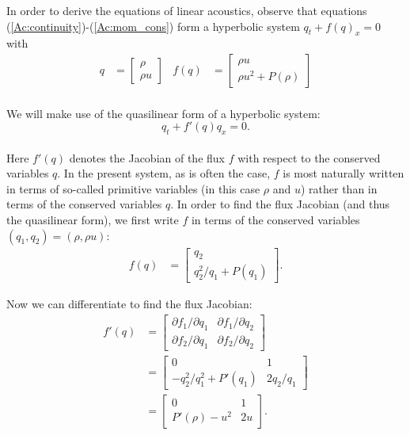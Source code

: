\documentclass[11pt]{article}
\begin{document}
    In order to derive the equations of linear acoustics, observe that
equations (\ref{Ac:continuity})-(\ref{Ac:mom_cons}) form a hyperbolic
system \(q_t+f(q)_x=0\) with\\
\begin{align*}
q & = \begin{bmatrix} \rho \\ \rho u \end{bmatrix} & 
f(q) & = \begin{bmatrix} \rho u \\ \rho u^2 + P(\rho) \end{bmatrix}
\end{align*}\\
We will make use of the quasilinear form of a hyperbolic system:
\[q_t + f'(q) q_x = 0.\]\\
Here \(f'(q)\) denotes the Jacobian of the flux \(f\) with respect to
the conserved variables \(q\). In the present system, as is often the
case, \(f\) is most naturally written in terms of so-called primitive
variables (in this case \(\rho\) and \(u\)) rather than in terms of the
conserved variables \(q\). In order to find the flux Jacobian (and thus
the quasilinear form), we first write \(f\) in terms of the conserved
variables \((q_1,q_2) = (\rho, \rho u)\):\\
\begin{align}
f(q) & = \begin{bmatrix} q_2 \\ q_2^2/q_1 + P(q_1) \end{bmatrix}.
\end{align}

    Now we can differentiate to find the flux Jacobian:\\
\begin{align*}
f'(q) & = \begin{bmatrix} \partial f_1/\partial q_1 & \partial f_1/\partial q_2 \\
                          \partial f_2/\partial q_1 & \partial f_2/\partial q_2 \end{bmatrix} \\
      & = \begin{bmatrix} 0 & 1 \\ -q_2^2/q_1^2 + P'(q_1) & 2q_2/q_1 \end{bmatrix} \\
      & = \begin{bmatrix} 0 & 1 \\ P'(\rho)-u^2 & 2u \end{bmatrix}.
\end{align*}
\end{document}
